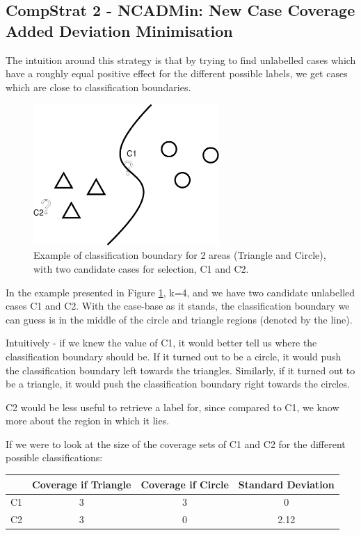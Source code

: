 \documentclass[a4paper,11pt]{report}
\begin{document}
\subsection{CompStrat 2 - NCADMin: New Case Coverage Added Deviation Minimisation}

The intuition around this strategy is that by trying to find unlabelled cases which have a roughly equal positive effect for the different possible labels, we get cases which are close to classification boundaries.

\begin{figure}[h!] \centering
\includegraphics[width=200pt]{./Drawn/NCADMin}
\caption{Example of classification boundary for 2 areas (Triangle and Circle), with two candidate cases for selection, C1 and C2.}
\label{fig:ncadmin}
\end{figure}

In the example presented in Figure \ref{fig:ncadmin}, k=4, and we have two candidate unlabelled cases C1 and C2. With the case-base as it stands, the classification boundary we can guess is in the middle of the circle and triangle regions (denoted by the line).
 
Intuitively - if we knew the value of C1, it would better tell us where the classification boundary should be. If it turned out to be a circle, it would push the classification boundary left towards the triangles. Similarly, if it turned out to be a triangle, it would push the classification boundary right towards the circles. 

C2 would be less useful to retrieve a label for, since compared to C1, we know more about the region in which it lies.

If we were to look at the size of the coverage sets of C1 and C2 for the different possible classifications:

\begin{tabular}{|c|c|c|c|}
\cline{2-4} 
\multicolumn{1}{c|}{} & Coverage if Triangle & Coverage if Circle & Standard Deviation\tabularnewline
\hline 
C1 & 3 & 3 & 0\tabularnewline
\hline 
C2 & 3 & 0 & 2.12\tabularnewline
\hline 
\end{tabular}
\end{document}
